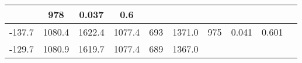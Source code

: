 \documentclass[a4paper,10pt]{article}
\begin{document}
\begin{longtable}{
     |
%    
    c|
%    
    c|
%    
    c|
%    
    c|
%    
    c|
%    
    c|
%    
    c|
%    
    c|
%    
    c|
%    
    c|
%    
    }
%        
        & 978
%        

%        

%        
        & 0.037
%        

%        

%        
        & 0.6
%        

%        
        \\
        \hline

        

%        

%        
        -137.7
%        

%        

%        
        & 1080.4
%        

%        

%        
        & 1622.4
%        

%        

%        
        & 1077.4
%        

%        

%        
        & 693
%        

%        

%        
        & 1371.0
%        

%        

%        
        & 975
%        

%        

%        
        & 0.041
%        

%        

%        
        & 0.601
%        

%        
        \\
        \hline

        

%        

%        
        -129.7
%        

%        

%        
        & 1080.9
%        

%        

%        
        & 1619.7
%        

%        

%        
        & 1077.4
%        

%        

%        
        & 689
%        

%        

%        
        & 1367.0
%        

%        


\end{longtable}
\end{document}
